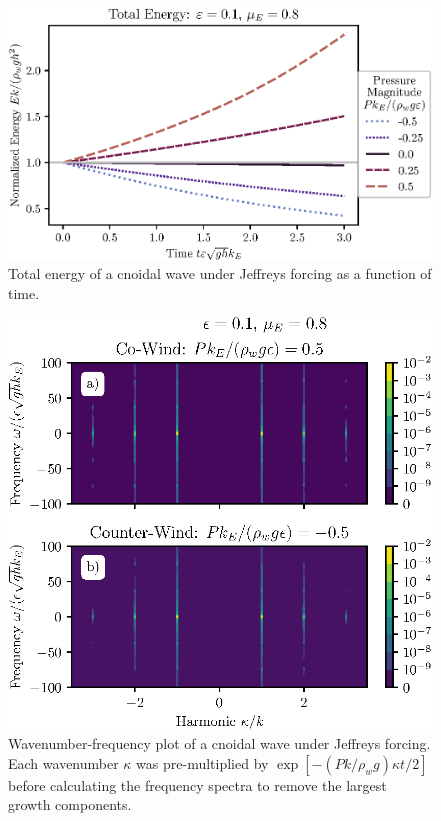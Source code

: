\documentclass{jfm}
\begin{document}
\begin{figure}
  \centering
  \includegraphics{Total-Energy-Jeffreys.eps}
  \caption{
    Total energy of a cnoidal wave under Jeffreys forcing as a function
    of time.
  }
\end{figure}

\begin{figure}
  \centering
  \includegraphics{Double-Power-Spectrum-Jeffreys.eps}
  \caption{
    Wavenumber-frequency plot of a cnoidal wave under Jeffreys forcing.
    Each wavenumber $\kappa$ was pre-multiplied by $\exp[-(P k/\rho_w
    g) \kappa t/2]$ before calculating the frequency spectra to remove
    the largest growth components.
  }
\end{figure}
\end{document}
